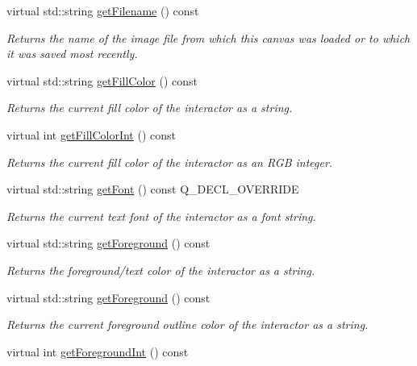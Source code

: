 \begin{DoxyCompactItemize}
virtual std\+::string \mbox{\hyperlink{classGCanvas_a2011812670c3de9747702e3c052b6bb3}{get\+Filename}} () const
\begin{DoxyCompactList}\small\item\em Returns the name of the image file from which this canvas was loaded or to which it was saved most recently. \end{DoxyCompactList}\item 
virtual std\+::string \mbox{\hyperlink{classGDrawingSurface_a76f6964a11fde7c78e9751be184e1a3c}{get\+Fill\+Color}} () const
\begin{DoxyCompactList}\small\item\em Returns the current fill color of the interactor as a string. \end{DoxyCompactList}\item 
virtual int \mbox{\hyperlink{classGDrawingSurface_a88f4508d9271c4b5f5b5d6b780f223d0}{get\+Fill\+Color\+Int}} () const
\begin{DoxyCompactList}\small\item\em Returns the current fill color of the interactor as an R\+GB integer. \end{DoxyCompactList}\item 
virtual std\+::string \mbox{\hyperlink{classGCanvas_a24420d98f18927d2c201a3ab55ffdcec}{get\+Font}} () const Q\+\_\+\+D\+E\+C\+L\+\_\+\+O\+V\+E\+R\+R\+I\+DE
\begin{DoxyCompactList}\small\item\em Returns the current text font of the interactor as a font string. \end{DoxyCompactList}\item 
virtual std\+::string \mbox{\hyperlink{classGInteractor_a4fa2d8b0192a3a5b4af4bbfe71194d03}{get\+Foreground}} () const
\begin{DoxyCompactList}\small\item\em Returns the foreground/text color of the interactor as a string. \end{DoxyCompactList}\item 
virtual std\+::string \mbox{\hyperlink{classGDrawingSurface_a4fa2d8b0192a3a5b4af4bbfe71194d03}{get\+Foreground}} () const
\begin{DoxyCompactList}\small\item\em Returns the current foreground outline color of the interactor as a string. \end{DoxyCompactList}\item 
virtual int \mbox{\hyperlink{classGInteractor_ac3b12ab385a6ef9ae90fc879860ba726}{get\+Foreground\+Int}} () const

\end{DoxyCompactItemize}
